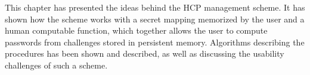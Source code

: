 \par This chapter has presented the ideas behind the HCP management scheme. It has shown how the scheme works with a secret mapping memorized by the user and a human computable function, which together allows the user to compute passwords from challenges stored in persistent memory. Algorithms describing the procedures has been shown and described, as well as discussing the usability challenges of such a scheme.
